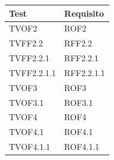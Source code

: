 \documentclass[openany,12pt,a4paper]{report}
\begin{document}
\begin{longtable}{| p{4cm} |p{4cm}|}
	\hline
	\textbf{Test} & \textbf{Requisito}\\
	\hline
	\endhead
	 TVOF2&ROF2
	\\[1em]	
	\hline	
	 TVFF2.2&RFF2.2
	\\[1em]	
	\hline
	 TVFF2.2.1&RFF2.2.1
	\\[1em]	
	\hline
	 TVFF2.2.1.1&RFF2.2.1.1
	\\[1em]	
	\hline
	 TVOF3&	ROF3
	\\[1em]	
	\hline	
	
	 TVOF3.1&ROF3.1
	\\[1em]		
	\hline
	 TVOF4&ROF4
	\\[1em]
	\hline
	
	 TVOF4.1&ROF4.1
	\\[1em]
	
	\hline	
	TVOF4.1.1&ROF4.1.1
	\\[1em]
	

\end{longtable}
\end{document}
